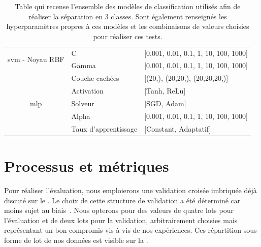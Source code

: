 \begin{table}[H]
\begin{tabular}{cll}
        \multirow{2}{*}{\gls{svm} - Noyau RBF}          & C                         & [0.001, 0.01, 0.1, 1, 10, 100, 1000]      \\ \cmidrule{2-3}   
                                                        & Gamma                     & [0.001, 0.01, 0.1, 1, 10, 100, 1000]      \\ \midrule 
        \multirow{5}{*}{\gls{mlp}}                      & Couche cachées            & [(20,), (20,20,), (20,20,20,)]            \\ \cmidrule{2-3}
                                                        & Activation                & [Tanh, ReLu]                              \\ \cmidrule{2-3}
                                                        & Solveur                   & [SGD, Adam]                               \\ \cmidrule{2-3}
                                                        & Alpha                     & [0.001, 0.01, 0.1, 1, 10, 100, 1000]      \\ \cmidrule{2-3}
                                                        & Taux d'apprentissage      & [Constant, Adaptatif]                     \\ \bottomrule 
    \end{tabular} 
    \label{tab:image_hyperparameters}
    \caption{Table qui recense l'ensemble des modèles de classification utilisés afin de réaliser la séparation en 3 classes. Sont également renseignés les hyperparamètres propres à ces modèles et les combinaisons de valeurs choisies pour réaliser ces tests.}
\end{table}\par

\section{Processus et métriques}
Pour réaliser l'évaluation, nous emploierons une validation croisée imbriquée déjà discuté sur le . Le choix de cette structure de validation a été déterminé car moins sujet au biais~\cite{Cawley2010}. Nous opterons pour des valeurs de quatre lots pour l'évaluation et de deux lots pour la validation, arbitrairement choisies mais représentant un bon compromis vis à vis de nos expériences. Ces répartition sous forme de lot de nos données est visible sur la .\par

